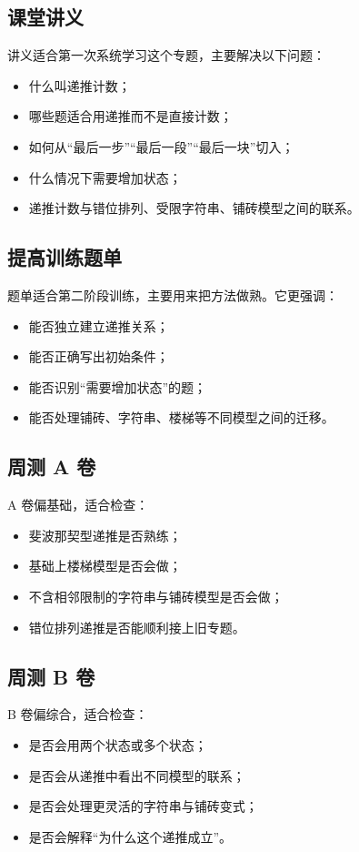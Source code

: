 \documentclass[11pt,a4paper,fontset=fandol]{ctexart}
\begin{document}
\subsection{课堂讲义}
讲义适合第一次系统学习这个专题，主要解决以下问题：
\begin{itemize}
  \item 什么叫递推计数；
  \item 哪些题适合用递推而不是直接计数；
  \item 如何从“最后一步”“最后一段”“最后一块”切入；
  \item 什么情况下需要增加状态；
  \item 递推计数与错位排列、受限字符串、铺砖模型之间的联系。
\end{itemize}

\subsection{提高训练题单}
题单适合第二阶段训练，主要用来把方法做熟。它更强调：
\begin{itemize}
  \item 能否独立建立递推关系；
  \item 能否正确写出初始条件；
  \item 能否识别“需要增加状态”的题；
  \item 能否处理铺砖、字符串、楼梯等不同模型之间的迁移。
\end{itemize}

\subsection{周测 A 卷}
A 卷偏基础，适合检查：
\begin{itemize}
  \item 斐波那契型递推是否熟练；
  \item 基础上楼梯模型是否会做；
  \item 不含相邻限制的字符串与铺砖模型是否会做；
  \item 错位排列递推是否能顺利接上旧专题。
\end{itemize}

\subsection{周测 B 卷}
B 卷偏综合，适合检查：
\begin{itemize}
  \item 是否会用两个状态或多个状态；
  \item 是否会从递推中看出不同模型的联系；
  \item 是否会处理更灵活的字符串与铺砖变式；
  \item 是否会解释“为什么这个递推成立”。
\end{itemize}
\end{document}
